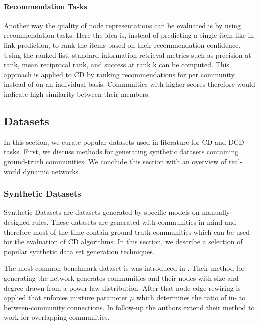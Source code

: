 \documentclass[
acmsmall,
nonacm,
screen,
acmthm]{../../scripts/pandoc/templates/acmart}
\begin{document}
\hypertarget{recommendation-tasks}{%
\paragraph{Recommendation Tasks}\label{recommendation-tasks}}

Another way the quality of node representations can be evaluated is by
using recommendation tasks. Here the idea is, instead of predicting a
single item like in link-prediction, to rank the items based on their
recommendation confidence. Using the ranked list, standard information
retrieval metrics such as precision at rank, mean reciprocal rank, and
success at rank k can be computed. This approach is applied to CD
\citep{rozemberczkiGEMSECGraphEmbedding2019, huangInformationFusionOriented2022, faniUserCommunityDetection2020}
by ranking recommendations for per community instead of on an individual
basis. Communities with higher scores therefore would indicate high
similarity between their members.

\hypertarget{datasets}{%
\subsection{Datasets}\label{datasets}}

In this section, we curate popular datasets used in literature for CD
and DCD tasks. First, we discuss methods for generating synthetic
datasets containing ground-truth communities. We conclude this section
with an overview of real-world dynamic networks.

\hypertarget{synthetic-datasets}{%
\subsubsection{Synthetic Datasets}\label{synthetic-datasets}}

Synthetic Datasets are datasets generated by specific models on manually
designed rules. These datasets are generated with communities in mind
and therefore most of the time contain ground-truth communities which
can be used for the evaluation of CD algorithms. In this section, we
describe a selection of popular synthetic data set generation
techniques.

The most common benchmark dataset is was introduced in
\citet{lancichinettiBenchmarkGraphsTesting2008}. Their method for
generating the network generates communities and their nodes with size
and degree drawn from a power-law distribution. After that node edge
rewiring is applied that enforces mixture parameter \(\mu\) which
determines the ratio of in- to between-community connections. In
follow-up \citep{lancichinettiBenchmarksTestingCommunity2009} the
authors extend their method to work for overlapping communities.
\end{document}

